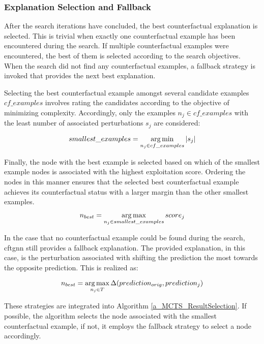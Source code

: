 \subsubsection{Explanation Selection and Fallback}
\label{s_Methodology_CoDy_Fallback}
After the search iterations have concluded, the best counterfactual explanation is selected. This is trivial when exactly one counterfactual example has been encountered during the search. If multiple counterfactual examples were encountered, the best of them is selected according to the search objectives. When the search did not find any counterfactual examples, a fallback strategy is invoked that provides the next best explanation.

Selecting the best counterfactual example amongst several candidate examples \(cf\_examples\) involves rating the candidates according to the objective of minimizing complexity. Accordingly, only the examples $n_j \in cf\_examples$ with the least number of associated perturbations $s_j$ are considered:

\begin{equation}
    smallest\_examples = \operatorname*{arg\,min}_{n_j \in cf\_examples} |s_j|
\end{equation}

Finally, the node with the best example is selected based on which of the smallest example nodes is associated with the highest exploitation score. Ordering the nodes in this manner ensures that the selected best counterfactual example achieves its counterfactual status with a larger margin than the other smallest examples.

\begin{equation}
    n_{best} = \operatorname*{arg\,max}_{n_j \in smallest\_examples} score_j
\end{equation}

In the case that no counterfactual example could be found during the search, \gls{cftgnn} still provides a fallback explanation. The provided explanation, in this case, is the perturbation associated with shifting the prediction the most towards the opposite prediction. This is realized as:

\begin{equation}
    n_{best} = \operatorname*{arg\,max}_{n_j \in T} \Delta(prediction_{orig}, prediction_j)
\end{equation}

These strategies are integrated into Algorithm \ref{a_MCTS_ResultSelection}. If possible, the algorithm selects the node associated with the smallest counterfactual example, if not, it employs the fallback strategy to select a node accordingly.

